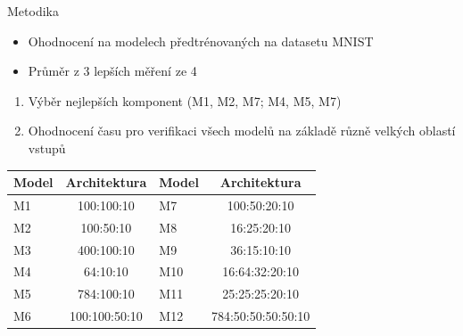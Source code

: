 \documentclass{beamer}
\begin{document}
    \begin{frame}{Metodika}
        \begin{itemize}
            \item Ohodnocení na modelech předtrénovaných na datasetu MNIST
            \item Průměr z 3 lepších měření ze 4
        \end{itemize}
        \begin{enumerate}
            \item Výběr nejlepších komponent (M1, M2, M7; M4, M5, M7)
            \item Ohodnocení času pro verifikaci všech modelů na základě různě velkých oblastí vstupů
        \end{enumerate}

        {\footnotesize
\begin{table}[H]
\begin{tabular}{l c | l c}  %
    \toprule{}%
    Model & Architektura  & Model & Architektura       \\ \midrule
    M1    & 100:100:10    & M7    & 100:50:20:10       \\
    M2    & 100:50:10     & M8    & 16:25:20:10        \\
    M3    & 400:100:10    & M9    & 36:15:10:10        \\
    M4    & 64:10:10      & M10   & 16:64:32:20:10     \\
    M5    & 784:100:10    & M11   & 25:25:25:20:10     \\
    M6    & 100:100:50:10 & M12   & 784:50:50:50:50:10 \\ \bottomrule
\end{tabular}
\end{table}
        }
    \end{frame}

\newcommand\modelsArch{%
    1_blk_100_100_10/M1,%
    1_blk_100_50_10/M2,%
    1_blk_400_100_10/M3,%
    1_blk_64_10_10/M4,%
    1_blk_784_100_10/M5,%
    2_blk_100_100_50_10/M6,%
    2_blk_100_50_20_10/M7,%
    2_blk_16_25_20_10/M8,%
    2_blk_36_15_10_10/M9,%
    3_blk_16_64_32_20_10/M10,%
    3_blk_25_25_25_20_10/M11,%
    4_blk_784_50_50_50_50_10/M12,%
}

\newcommand\modelsSmall{%
    1_blk_100_100_10/M1,%
    1_blk_100_50_10/M2,%
    2_blk_100_50_20_10/M7,%
}

\newcommand\fixedLen{0_/0,4_/4,8_/8,12/12,16/16,20/20,24/24}

\makeatletter
\newcommand{\strequal}[2]{\pdf@strcmp{#1}{#2}==0}
\makeatother
\end{document}
